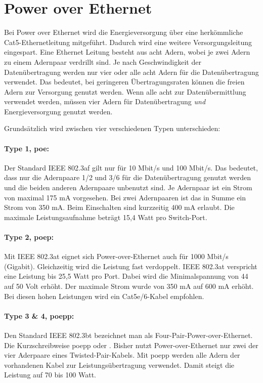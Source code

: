 \section{Power over Ethernet}
Bei Power over Ethernet wird die Energieversorgung über eine herkömmliche Cat5-Ethernetleitung mitgeführt.
Dadurch wird eine weitere Versorgungsleitung eingespart.
Eine Ethernet Leitung besteht aus acht Adern, wobei je zwei Adern zu einem Adernpaar verdrillt sind.
Je nach Geschwindigkeit der Datenübertragung werden nur vier oder alle acht Adern für die Datenübertragung verwendet.
Das bedeutet, bei geringeren Übertragungsraten können die freien Adern zur Versorgung genutzt werden.
Wenn alle acht zur Datenübermittlung verwendet werden, müssen vier Adern für Datenübertragung \emph{und} Energieversorgung genutzt werden.\par

Grundsätzlich wird zwischen vier verschiedenen Typen unterschieden:
\paragraph{Type 1, \ac{poe}:}
Der Standard IEEE 802.3af gilt nur für 10 Mbit/s und 100 Mbit/s.
Das bedeutet, dass nur die Adernpaare 1/2 und 3/6 für die Datenübertragung genutzt werden und die beiden anderen Adernpaare unbenutzt sind.
Je Adernpaar ist ein Strom von maximal 175 mA vorgesehen. Bei zwei Adernpaaren ist das in Summe ein Strom von 350 mA.
Beim Einschalten sind kurzzeitig 400 mA erlaubt.
Die maximale Leistungsaufnahme beträgt 15,4 Watt pro Switch-Port.

\paragraph{Type 2, \ac{poep}:}
Mit IEEE 802.3at eignet sich Power-over-Ethernet auch für 1000 Mbit/s (Gigabit).
Gleichzeitig wird die Leistung fast verdoppelt.
IEEE 802.3at verspricht eine Leistung bis 25,5 Watt pro Port.
Dabei wird die Minimalspannung von 44 auf 50 Volt erhöht.
Der maximale Strom wurde von 350 mA auf 600 mA erhöht.
Bei diesen hohen Leistungen wird ein Cat5e/6-Kabel empfohlen.

\paragraph{Type 3 \& 4, \ac{poepp}:}
Den Standard IEEE 802.3bt bezeichnet man als Four-Pair-Power-over-Ethernet. Die Kurzschreibweise \ac{poepp} oder .
Bisher nutzt Power-over-Ethernet nur zwei der vier Aderpaare eines Twisted-Pair-Kabels. Mit \ac{poepp} werden alle Adern der vorhandenen Kabel zur Leistungsübertragung verwendet. Damit steigt die Leistung auf 70 bis 100 Watt.

